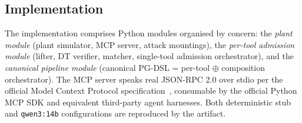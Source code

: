 \subsection{Implementation}

The implementation comprises Python modules organised by concern:
the \emph{plant module} (plant simulator, MCP server, attack
mountings), the \emph{per-tool admission module} (lifter, DT
verifier, matcher, single-tool admission orchestrator), and the
\emph{canonical pipeline module} (canonical PG-DSL = per-tool
$\oplus$ composition orchestrator). The MCP server speaks real
JSON-RPC 2.0 over stdio per the official Model Context Protocol
specification~\cite{mcp_spec}, consumable by the official Python MCP
SDK and equivalent third-party agent harnesses. Both deterministic
stub and \texttt{qwen3:14b} configurations are reproduced by the
artifact.

